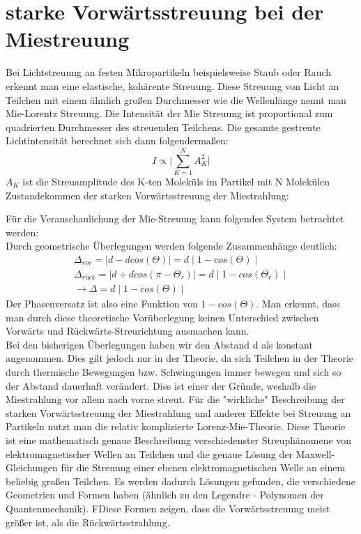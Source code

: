\section{starke Vorwärtsstreuung bei der Miestreuung}
Bei Lichtstreuung an festen Mikropartikeln beispielsweise Staub oder Rauch erkennt man eine elastische, kohärente Streuung. Diese Streuung von Licht an Teilchen mit einem ähnlich großen Durchmesser wie die Wellenlänge nennt man Mie-Lorentz Streuung. Die Intensität der Mie Streuung ist proportional zum quadrierten Durchmesser des streuenden Teilchens. Die gesamte gestreute Lichtintensität berechnet sich dann folgendermaßen:
\begin{equation}
I\propto \biggl| \sum_{K=1}^N A^2_K \biggl|
\end{equation}
$A_K$ ist die Streuamplitude des K-ten Moleküls im Partikel mit N Molekülen
Zustandekommen der starken Vorwärtsstreuung der Miestrahlung: 

Für die Veranschaulichung der Mie-Streuung kann folgendes System betrachtet werden:\\
Durch geometrische Überlegungen werden folgende Zusammenhänge deutlich:
\begin{align*}
\Delta_{vor}=\mid d-dcos(\Theta)\mid=d\mid 1-cos(\Theta) \mid\\
\Delta_{rück}=\mid d+dcos(\pi-\Theta_r)\mid=d\mid 1-cos(\Theta_r) \mid\\
\rightarrow \Delta = d\mid 1-cos(\Theta) \mid
\end{align*}
Der Phasenversatz ist also eine Funktion von $1-cos(\Theta)$.
Man erkennt, dass man durch diese theoretische Vorüberlegung keinen Unterschied zwischen Vorwärts und Rückwärts-Streurichtung ausmachen kann. \\
Bei den bisherigen Überlegungen haben wir den Abstand d als konstant angenommen. Dies gilt jedoch nur in der Theorie, da sich Teilchen in der Theorie durch thermische Bewegungen bzw. Schwingungen immer bewegen und sich so der Abstand dauerhaft verändert. Dies ist einer der Gründe, weshalb die Miestrahlung vor allem nach vorne streut. 
Für die "wirkliche" Beschreibung der starken Vorwärtsstreuung der Miestrahlung und anderer Effekte bei Streuung an Partikeln nutzt man die relativ komplizierte Lorenz-Mie-Theorie. Diese Theorie ist eine mathematisch genaue Beschreibung verschiedenster Streuphänomene von elektromagnetischer Wellen an Teilchen und die genaue Lösung der Maxwell-Gleichungen für die Streuung einer ebenen elektromagnetischen Welle an einem beliebig großen Teilchen. Es werden dadurch Lösungen gefunden, die verschiedene Geometrien und Formen haben (ähnlich zu den Legendre - Polynomen der Quantenmechanik). FDiese Formen zeigen, dass die Vorwärtsstreuung meist größer ist, als die Rückwärtsstrahlung.

